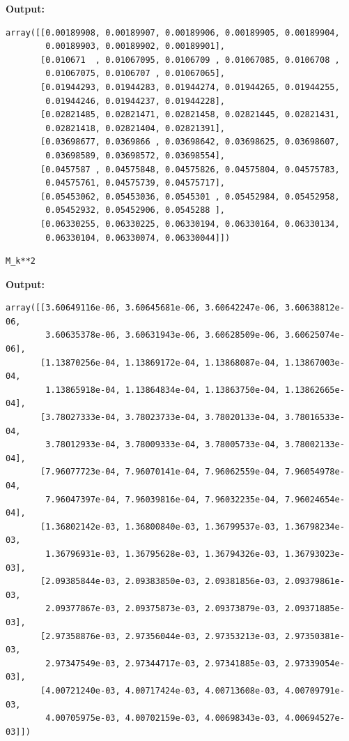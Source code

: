 \documentclass{article}
\begin{document}
\textbf{Output:}\begin{verbatim}
array([[0.00189908, 0.00189907, 0.00189906, 0.00189905, 0.00189904,
        0.00189903, 0.00189902, 0.00189901],
       [0.010671  , 0.01067095, 0.0106709 , 0.01067085, 0.0106708 ,
        0.01067075, 0.0106707 , 0.01067065],
       [0.01944293, 0.01944283, 0.01944274, 0.01944265, 0.01944255,
        0.01944246, 0.01944237, 0.01944228],
       [0.02821485, 0.02821471, 0.02821458, 0.02821445, 0.02821431,
        0.02821418, 0.02821404, 0.02821391],
       [0.03698677, 0.0369866 , 0.03698642, 0.03698625, 0.03698607,
        0.03698589, 0.03698572, 0.03698554],
       [0.0457587 , 0.04575848, 0.04575826, 0.04575804, 0.04575783,
        0.04575761, 0.04575739, 0.04575717],
       [0.05453062, 0.05453036, 0.0545301 , 0.05452984, 0.05452958,
        0.05452932, 0.05452906, 0.0545288 ],
       [0.06330255, 0.06330225, 0.06330194, 0.06330164, 0.06330134,
        0.06330104, 0.06330074, 0.06330044]])
\end{verbatim}

\begin{lstlisting}
M_k**2\end{lstlisting}

\textbf{Output:}\begin{verbatim}
array([[3.60649116e-06, 3.60645681e-06, 3.60642247e-06, 3.60638812e-06,
        3.60635378e-06, 3.60631943e-06, 3.60628509e-06, 3.60625074e-06],
       [1.13870256e-04, 1.13869172e-04, 1.13868087e-04, 1.13867003e-04,
        1.13865918e-04, 1.13864834e-04, 1.13863750e-04, 1.13862665e-04],
       [3.78027333e-04, 3.78023733e-04, 3.78020133e-04, 3.78016533e-04,
        3.78012933e-04, 3.78009333e-04, 3.78005733e-04, 3.78002133e-04],
       [7.96077723e-04, 7.96070141e-04, 7.96062559e-04, 7.96054978e-04,
        7.96047397e-04, 7.96039816e-04, 7.96032235e-04, 7.96024654e-04],
       [1.36802142e-03, 1.36800840e-03, 1.36799537e-03, 1.36798234e-03,
        1.36796931e-03, 1.36795628e-03, 1.36794326e-03, 1.36793023e-03],
       [2.09385844e-03, 2.09383850e-03, 2.09381856e-03, 2.09379861e-03,
        2.09377867e-03, 2.09375873e-03, 2.09373879e-03, 2.09371885e-03],
       [2.97358876e-03, 2.97356044e-03, 2.97353213e-03, 2.97350381e-03,
        2.97347549e-03, 2.97344717e-03, 2.97341885e-03, 2.97339054e-03],
       [4.00721240e-03, 4.00717424e-03, 4.00713608e-03, 4.00709791e-03,
        4.00705975e-03, 4.00702159e-03, 4.00698343e-03, 4.00694527e-03]])
\end{verbatim}
\end{document}
